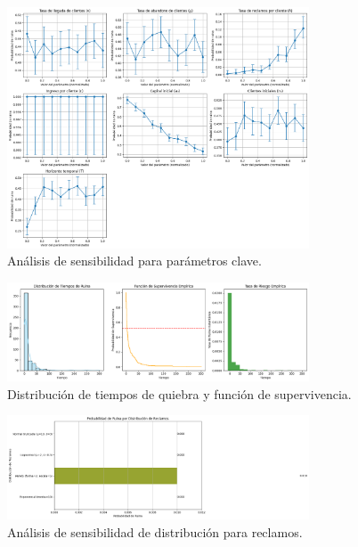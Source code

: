 \documentclass{article}
\begin{document}
\begin{figure}[ht]
    \centering
    \includegraphics[width=0.8\textwidth]{sensibilidad.png}
    \caption{Análisis de sensibilidad para parámetros clave.}
    \label{fig:sensibilidad}
\end{figure}

\begin{figure}[ht]
    \centering
    \includegraphics[width=0.8\textwidth]{Tiempos_Ruina.png}
    \caption{Distribución de tiempos de quiebra y función de supervivencia.}
    \label{fig:ruina}
\end{figure}

\begin{figure}[ht]
    \centering
    \includegraphics[width=0.8\textwidth]{Sensibilidad_distrib.png}
    \caption{Análisis de sensibilidad de distribución para reclamos.}
    \label{fig:distribución}
\end{figure}
\end{document}
